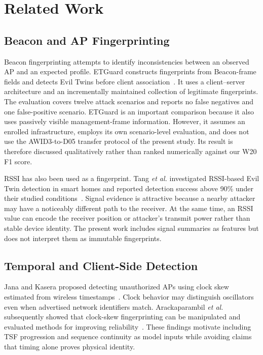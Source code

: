 \documentclass[conference]{IEEEtran}
\begin{document}
\section{Related Work}

\subsection{Beacon and AP Fingerprinting}

Beacon fingerprinting attempts to identify inconsistencies between an observed AP and an expected profile. ETGuard constructs fingerprints from Beacon-frame fields and detects Evil Twins before client association~\cite{jain2019etguard}. It uses a client--server architecture and an incrementally maintained collection of legitimate fingerprints. The evaluation covers twelve attack scenarios and reports no false negatives and one false-positive scenario. ETGuard is an important comparison because it also uses passively visible management-frame information. However, it assumes an enrolled infrastructure, employs its own scenario-level evaluation, and does not use the AWID3-to-D05 transfer protocol of the present study. Its result is therefore discussed qualitatively rather than ranked numerically against our W20 F1 score.

RSSI has also been used as a fingerprint. Tang \emph{et al.} investigated RSSI-based Evil Twin detection in smart homes and reported detection success above 90\% under their studied conditions~\cite{tang2017rssi}. Signal evidence is attractive because a nearby attacker may have a noticeably different path to the receiver. At the same time, an RSSI value can encode the receiver position or attacker's transmit power rather than stable device identity. The present work includes signal summaries as features but does not interpret them as immutable fingerprints.

\subsection{Temporal and Client-Side Detection}

Jana and Kasera proposed detecting unauthorized APs using clock skew estimated from wireless timestamps~\cite{jana2010clock}. Clock behavior may distinguish oscillators even when advertised network identifiers match. Arackaparambil \emph{et al.} subsequently showed that clock-skew fingerprinting can be manipulated and evaluated methods for improving reliability~\cite{arackaparambil2010reliability}. These findings motivate including TSF progression and sequence continuity as model inputs while avoiding claims that timing alone proves physical identity.
\end{document}
